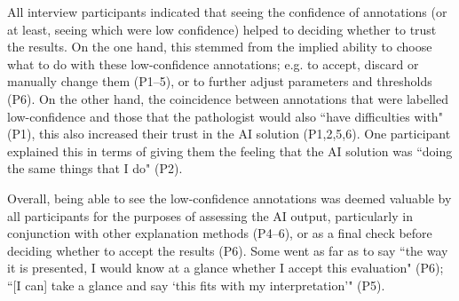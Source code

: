 
All interview participants indicated that seeing the confidence of annotations (or at least, seeing which were low confidence) helped to deciding whether to trust the results. On the one hand, this stemmed from the implied ability to choose what to do with these low-confidence annotations; e.g. to accept, discard or manually change them (P1--5), or to further adjust parameters and thresholds (P6). On the other hand, the coincidence between annotations that were labelled low-confidence and those that the pathologist would also ``have difficulties with" (P1), this also increased their trust in the AI solution (P1,2,5,6). One participant explained this in terms of giving them the feeling that the AI solution was ``doing the same things that I do" (P2). 


Overall, being able to see the low-confidence annotations was deemed valuable by all participants for the purposes of assessing the AI output, particularly in conjunction with other explanation methods (P4--6), or as a final check before deciding whether to accept the results (P6). Some went as far as to say ``the way it is presented, I would know at a glance whether I accept this evaluation" (P6); ``[I can] take a glance and say ‘this fits with my interpretation’" (P5).


